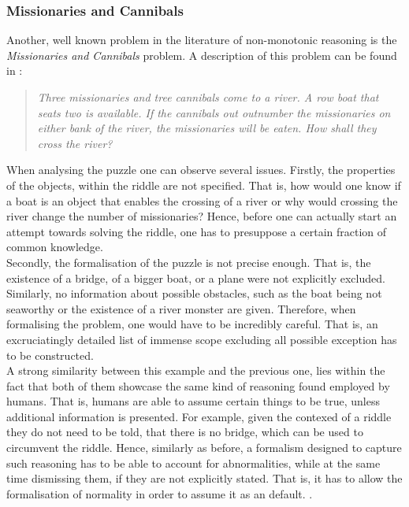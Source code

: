 \documentclass{article}
\begin{document}
\subsubsection*{Missionaries and Cannibals}
Another, well known problem in the literature of non-monotonic reasoning is the \emph{Missionaries and Cannibals} problem. A description of this problem can be found in \cite{mccarthy1981circumscription}:
\begin{quote}
\emph{Three missionaries and tree cannibals come to a river. A row boat that seats two is
available. If the cannibals out outnumber the missionaries on either bank of the river, the missionaries will be eaten. How shall they cross the river?}
\end{quote}

When analysing the puzzle one can observe several issues. Firstly, the properties of the objects, within the riddle are not specified. That is, how would one know if a boat is an object that enables the crossing of a river or why would crossing the river change the number of missionaries? Hence, before one can actually start an attempt towards solving the riddle, one has to presuppose a certain fraction of common knowledge. \\
Secondly, the formalisation of the puzzle is not precise enough. That is, the existence of a bridge, of a bigger boat, or a plane were not explicitly excluded. Similarly, no information about possible obstacles, such as the boat being not seaworthy or the existence of a river monster are given.  Therefore, 
when formalising the problem, one would have to be incredibly careful. That is, an excruciatingly detailed list of immense scope excluding all possible exception has to be constructed.\\
A strong similarity between this example and the previous one, lies within the fact that both of them showcase the same kind of reasoning found employed by humans. That is, humans are able to assume certain things to be true, unless additional information is presented. For example, given the contexed of a riddle they do not need to be told, that there is no bridge, which can be used to circumvent the riddle. Hence, similarly as before, a formalism designed to capture such reasoning has to be able to account for abnormalities, while at the same time dismissing them, if they are not explicitly stated. That is, it has to allow the formalisation of normality in order to assume it as an default. \cite{mccarthy1981circumscription,BOCHMAN2007557}. \\
\end{document}
